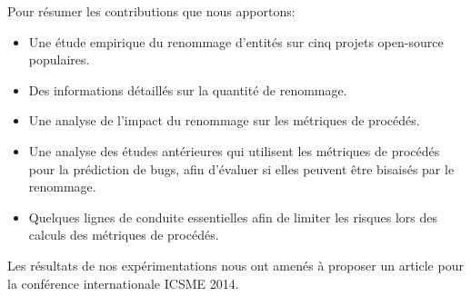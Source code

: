 Pour résumer les contributions que nous apportons:
\begin{itemize}
\item Une étude empirique du renommage d'entités sur cinq projets open-source populaires.    
\item Des informations détaillés sur la quantité de renommage.
\item Une analyse de l'impact du renommage sur les métriques de procédés.
\item Une analyse des études antérieures qui utilisent les métriques de procédés pour la prédiction de bugs, afin d'évaluer si elles peuvent être bisaisés par le renommage. 
\item Quelques lignes de conduite essentielles afin de limiter les risques lors des calculs des métriques de procédés.\\
\end{itemize}


Les résultats de nos expérimentations nous ont amenés à proposer un article pour la conférence internationale ICSME 2014.

